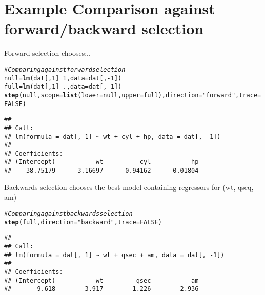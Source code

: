\documentclass{article}\usepackage[]{graphicx}\usepackage[]{color}
\makeatletter
\newcommand{\hlnum}[1]{\textcolor[rgb]{0.686,0.059,0.569}{#1}}%
\newcommand{\hlstr}[1]{\textcolor[rgb]{0.192,0.494,0.8}{#1}}%
\newcommand{\hlcom}[1]{\textcolor[rgb]{0.678,0.584,0.686}{\textit{#1}}}%
\newcommand{\hlopt}[1]{\textcolor[rgb]{0,0,0}{#1}}%
\newcommand{\hlstd}[1]{\textcolor[rgb]{0.345,0.345,0.345}{#1}}%
\newcommand{\hlkwb}[1]{\textcolor[rgb]{0.69,0.353,0.396}{#1}}%
\newcommand{\hlkwc}[1]{\textcolor[rgb]{0.333,0.667,0.333}{#1}}%
\newcommand{\hlkwd}[1]{\textcolor[rgb]{0.737,0.353,0.396}{\textbf{#1}}}%
\newenvironment{kframe}{%
 \def\at@end@of@kframe{}%
 \ifinner\ifhmode%
  \def\at@end@of@kframe{\end{minipage}}%
  \begin{minipage}{\columnwidth}%
 \fi\fi%
 \def\FrameCommand##1{\hskip\@totalleftmargin \hskip-\fboxsep
 \colorbox{shadecolor}{##1}\hskip-\fboxsep
     \hskip-\linewidth \hskip-\@totalleftmargin \hskip\columnwidth}%
 \MakeFramed {\advance\hsize-\width
   \@totalleftmargin\z@ \linewidth\hsize
   \@setminipage}}%
 {\par\unskip\endMakeFramed%
 \at@end@of@kframe}
\newenvironment{knitrout}{}{} %
\makeatother
\begin{document}
\section*{Example Comparison against forward/backward selection}

Forward selection chooses:..
\begin{knitrout}
\color{fgcolor}\begin{kframe}
\begin{alltt}
\hlcom{# Comparing against forward selection}
\hlstd{null}\hlkwb{=}\hlkwd{lm}\hlstd{(dat[,}\hlnum{1}\hlstd{]}\hlopt{~}\hlnum{1}\hlstd{,} \hlkwc{data}\hlstd{=dat[,}\hlopt{-}\hlnum{1}\hlstd{])}
\hlstd{full}\hlkwb{=}\hlkwd{lm}\hlstd{(dat[,}\hlnum{1}\hlstd{]}\hlopt{~}\hlstd{.,} \hlkwc{data}\hlstd{=dat[,}\hlopt{-}\hlnum{1}\hlstd{])}
\hlkwd{step}\hlstd{(null,} \hlkwc{scope}\hlstd{=}\hlkwd{list}\hlstd{(}\hlkwc{lower}\hlstd{=null,} \hlkwc{upper}\hlstd{=full),} \hlkwc{direction}\hlstd{=}\hlstr{"forward"}\hlstd{,}\hlkwc{trace}\hlstd{=}\hlnum{FALSE}\hlstd{)}
\end{alltt}
\begin{verbatim}
## 
## Call:
## lm(formula = dat[, 1] ~ wt + cyl + hp, data = dat[, -1])
## 
## Coefficients:
## (Intercept)           wt          cyl           hp  
##    38.75179     -3.16697     -0.94162     -0.01804
\end{verbatim}
\end{kframe}
\end{knitrout}

Backwards selection chooses the best model containing regressors for (wt, qseq, am)
\begin{knitrout}
\color{fgcolor}\begin{kframe}
\begin{alltt}
\hlcom{# Comparing against backwards selection}
\hlkwd{step}\hlstd{(full,} \hlkwc{direction}\hlstd{=}\hlstr{"backward"}\hlstd{,}\hlkwc{trace}\hlstd{=}\hlnum{FALSE}\hlstd{)}
\end{alltt}
\begin{verbatim}
## 
## Call:
## lm(formula = dat[, 1] ~ wt + qsec + am, data = dat[, -1])
## 
## Coefficients:
## (Intercept)           wt         qsec           am  
##       9.618       -3.917        1.226        2.936
\end{verbatim}
\end{kframe}
\end{knitrout}
\end{document}
